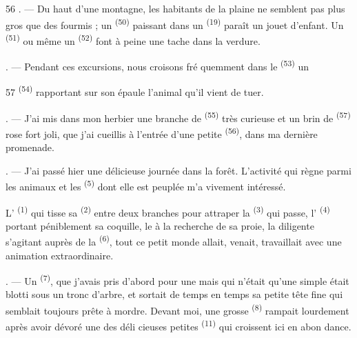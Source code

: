 \begin{VUpage}[58]{56}
. --- Du haut d'une montagne, les habitants de la\nl
plaine ne semblent pas plus gros que des fourmis ; un\nl
{} \textsuperscript{(50)} paissant dans un \cc
{} \textsuperscript{(19)} paraît un jouet d'enfant. Un  \textsuperscript{(51)} ou même\nl
un  \textsuperscript{(52)} font à peine une tache dans la verdure.

. --- Pendant ces excursions, nous croisons fré\cc
quemment dans le  \textsuperscript{(53)} un 
\parplein
\end{VUpage}

\begin{VUpage}[59]{57}
\VUcontinue
{} \textsuperscript{(54)} rapportant sur son épaule l'animal qu'il\nl
vient de tuer.

. --- J'ai mis dans mon herbier une branche de\nl
{} \textsuperscript{(55)} très curieuse et un brin de  \textsuperscript{(57)}\nl
rose fort joli, que j'ai cueillis à l'entrée d'une petite\nl
{} \textsuperscript{(56)}, dans ma dernière promenade.

\VUsaut{3.0mm}
\VUsaut{3.0mm}

\VUsaut{3.0mm}

. --- J'ai passé hier une délicieuse journée dans la\nl
forêt. L'activité qui règne parmi les animaux et les\nl
{} \textsuperscript{(5)} dont elle est peuplée m'a vivement\nl
intéressé.

\VUblancAlinea
L' \textsuperscript{(1)} qui tisse sa  \textsuperscript{(2)} entre deux\nl
branches pour attraper la  \textsuperscript{(3)} qui passe,\nl
l' \textsuperscript{(4)} portant péniblement sa coquille, le\nl
{} à la recherche de sa proie, la \nl
diligente s'agitant auprès de la  \textsuperscript{(6)}, tout\nl
ce petit monde allait, venait, travaillait avec une\nl
animation extraordinaire.

. --- Un  \textsuperscript{(7)}, que j'avais pris d'abord pour\nl
une  mais qui n'était qu'une simple \cc
{} était blotti sous un tronc d'arbre, et sortait de\nl
temps en temps sa petite tête fine qui semblait toujours\nl
prête à mordre. Devant moi, une grosse  \textsuperscript{(8)}\nl
rampait lourdement après avoir dévoré une des déli\cc
cieuses petites  \textsuperscript{(11)} qui croissent ici en abon\cc
dance.


\end{VUpage}
